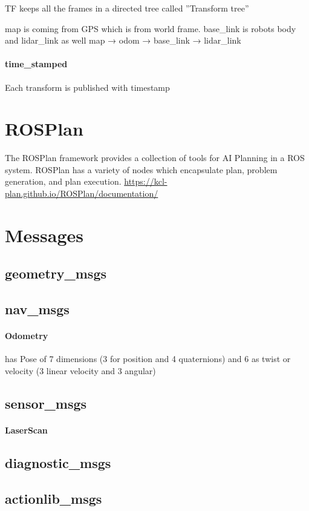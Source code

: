     TF keeps all the frames in a directed tree called ''Transform tree''
    
    
    map is coming from GPS which is from world frame. base\_link is robots body and lidar\_link as well
    map → odom → base\_link → lidar\_link
    
    \paragraph{time\_stamped}
        Each transform is published with timestamp
        
\section{ROSPlan}
    The ROSPlan framework provides a collection of tools for AI Planning in a ROS system. ROSPlan has a variety of nodes which encapsulate plan, problem generation, and plan execution.
    \url{https://kcl-plan.github.io/ROSPlan/documentation/}
\section{Messages}
    \subsection{geometry\_msgs}
    \subsection{nav\_msgs}
        \paragraph{Odometry}
            has Pose of 7 dimensions (3 for position and 4 quaternions) and 6 as twist or velocity (3 linear velocity and 3 angular)
    \subsection{sensor\_msgs}
        \paragraph{LaserScan}
    \subsection{diagnostic\_msgs}
    \subsection{actionlib\_msgs}
